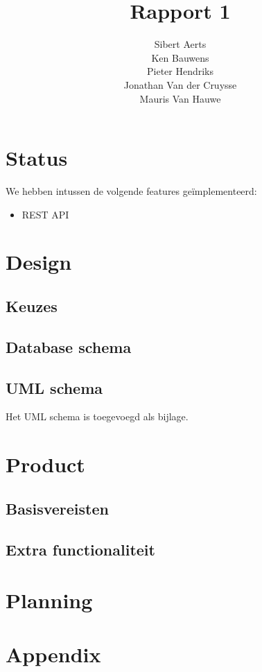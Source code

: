 \documentclass[12pt,a4paper]{article}
\begin{document}
\title{Rapport 1}
\author{Sibert Aerts \\ Ken Bauwens \\ Pieter Hendriks \\ Jonathan Van der Cruysse \\ Mauris Van Hauwe}
\maketitle

\section{Status}

We hebben intussen de volgende features ge\"implementeerd:

\begin{itemize}

\item REST API

\end{itemize}

\section{Design}

\subsection{Keuzes}

\subsection{Database schema}

\subsection{UML schema}

Het UML schema is toegevoegd als bijlage.

\section{Product}

\subsection{Basisvereisten}

\subsection{Extra functionaliteit}

\section{Planning}

\section{Appendix}
\end{document}
